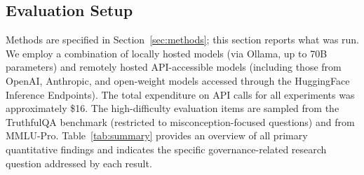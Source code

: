 \documentclass[manuscript,screen,review]{acmart}
\begin{document}
\subsection{Evaluation Setup}
Methods are specified in Section~\ref{sec:methods}; this section reports what was run. We employ a combination of locally hosted models (via Ollama, up to 70B parameters) and remotely hosted API-accessible models (including those from OpenAI, Anthropic, and open-weight models accessed through the HuggingFace Inference Endpoints). The total expenditure on API calls for all experiments was approximately \$16. The high-difficulty evaluation items are sampled from the TruthfulQA benchmark (restricted to misconception-focused questions) and from MMLU-Pro. Table~\ref{tab:summary} provides an overview of all primary quantitative findings and indicates the specific governance-related research question addressed by each result.
\end{document}
